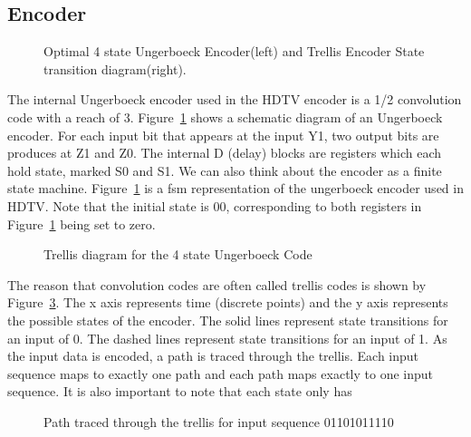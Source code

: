 \subsection{Encoder}

\begin{figure}
\center
\epsfxsize=3.0in
\epsfxsize=3.0in
\caption{Optimal 4 state Ungerboeck Encoder(left) and Trellis Encoder State transition diagram(right).}
\label{fig:ungerboeck-and-std}
\end{figure}

The internal Ungerboeck encoder used in the HDTV encoder is
a 1/2 convolution code with a reach of 3. Figure~\ref{fig:ungerboeck-and-std}
shows a schematic diagram of an Ungerboeck encoder. For each input bit
that appears at the input Y1, two output bits are produces at Z1 and Z0.
The internal D (delay) blocks are registers which each hold state, marked
S0 and S1. We can also think about the encoder as a finite state machine.
Figure~\ref{fig:ungerboeck-and-std} is a fsm representation of the ungerboeck
encoder used in HDTV. Note that the initial state is 00, corresponding to 
both registers in Figure~\ref{fig:ungerboeck-and-std} being set to zero.

\begin{figure}
\center
\epsfxsize=4.5in
\caption{Trellis diagram for the 4 state Ungerboeck Code}
\label{fig:trellis-blank}
\end{figure}

The reason that convolution codes are often called trellis codes is shown by 
Figure~\ref{fig:trellis-example}. The x axis represents time (discrete points)
and the y axis represents the possible states of the encoder. The solid lines
represent state transitions for an input of 0. The dashed lines represent
state transitions for an input of 1. As the input
data is encoded, a path is traced through the trellis. Each input sequence maps 
to exactly one path and each path maps exactly to one input sequence. It
is also important to note that each state only has 

\begin{figure}
\center
\epsfxsize=4.5in
\caption{Path traced through the trellis for input sequence 01101011110}
\label{fig:trellis-example}
\end{figure}

